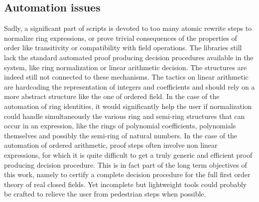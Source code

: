 \documentclass{mscs}
\begin{document}
\subsection{Automation issues}
Sadly, a significant part of scripts is devoted to too
many atomic rewrite steps to normalize ring expressions, or prove trivial
consequences of the properties of order like transitivity or
compatibility with field operations. The \ssr{} libraries still
lack the standard automated proof producing decision procedures
available in the \Coq{}
system, like ring normalization or linear arithmetic decision. The
\ssr{} structures are indeed still not connected to these
mechanisms. The \Coq{} tactics on linear arithmetic are hardcoding the
representation of integers and coefficients and should rely on a more
abstract structure like the one of ordered field. 
In the case of the automation of ring identities, it would significantly
help the user if normalization could handle simultaneously the various
ring and semi-ring structures that can occur in an expression, like
the rings of polynomial coefficients, polynomials themselves and
possibly the semi-ring of natural numbers.
In the case of the automation of ordered arithmetic, proof steps
often involve non linear expressions, for which it is quite difficult
to get a truly generic and efficient proof producing decision
procedure. This is in fact part of the long term objectives of this
work, namely to
certify a complete decision procedure for the full first order theory
of real closed fields. Yet incomplete but lightweight tools could
probably be crafted to relieve the user from pedestrian steps when
possible.
\end{document}
